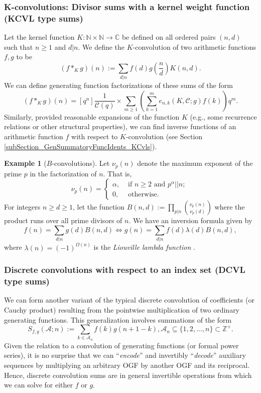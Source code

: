 \documentclass[12pt,reqno,a4letter]{article}
\numberwithin{figure}{section}
\numberwithin{table}{section}
\numberwithin{equation}{section}
\theoremstyle{plain}
\numberwithin{theorem}{section}
\theoremstyle{definition}
\newtheorem{example}[theorem]{Example}
\begin{document}
\subsubsection{K-convolutions: Divisor sums with a kernel weight function (KCVL type sums)} 

Let the kernel function $K: \mathbb{N} \times \mathbb{N} \rightarrow \mathbb{C}$ be defined on all 
ordered pairs $(n, d)$ such that $n \geq 1$ and $d|n$. 
We define the $K$-convolution of two arithmetic functions $f, g$ to be 
\[
(f \ast_K g)(n) := \sum_{d|n} f(d) g\left(\frac{n}{d}\right) K(n, d). 
\]
We can define generating function factorizations of these sums of the form 
\[
(f \ast_K g)(n) = [q^n] \frac{1}{\mathcal{C}(q)} \times 
     \sum_{m \geq 1} \left(\sum_{k=1}^{m} 
     e_{n,k}(K, \mathcal{C}; g) f(k)\right) q^m. 
\]
Similarly, provided reasonable expansions of the function $K$ (e.g., some recurrence relations or other structural properties), 
we can find inverse functions of an arithmetic function $f$ with respect to $K$-convolution 
(see Section \ref{subSection_GenSummatoryFuncIdents_KCvls}). 

\begin{example}[$B$-convolutions]
Let $\nu_p(n)$ denote the maximum exponent of the prime $p$ in the factorization of $n$. 
That is, 
\[
\nu_p(n) = \begin{cases}
     \alpha, & \text{ if $n \geq 2$ and $p^{\alpha} || n$; } \\ 
     0, & \text{ otherwise. } 
     \end{cases} 
\]
For integers $n \geq d \geq 1$, let the function 
$B(n, d) := \prod_{p|n} \binom{\nu_p(n)}{\nu_p(d)}$ where the product runs over all 
prime divisors of $n$. 
We have an inversion formula given by 
\[
f(n) = \sum_{d|n} g(d) B(n, d) \iff g(n) = \sum_{d|n} f(d) \lambda(d) B(n, d), 
\]
where $\lambda(n) = (-1)^{\Omega(n)}$ is the \emph{Liouville lambda function} 
\cite{HANDBOOKNT-2004}. 
\end{example} 

\subsubsection{Discrete convolutions with respect to an index set (DCVL type sums)} 
\label{subsubSection_SpecialSumCharExs_DCVL-1} 

We can form another variant of the typical discrete convolution of coefficients 
(or Cauchy product) resulting from the pointwise multiplication of 
two ordinary generating functions. This generalization involves 
summations of the form 
\[
S_{f,g}(\mathcal{A}; n) := \sum_{k \in \mathcal{A}_n} f(k) g(n+1-k), 
     \mathcal{A}_n \subseteq \{1,2,\ldots,n\} \subset \mathbb{Z}^{+}. 
\]
Given the relation to a convolution of generating functions (or formal power series), it is no 
surprise that we can ``\emph{encode}'' and invertibly 
``\emph{decode}'' auxiliary sequences by multiplying 
an arbitrary OGF by another OGF and its reciprocal. Hence, discrete convolution sums are in general 
invertible operations from which we can solve for either $f$ or $g$. 
\end{document}
